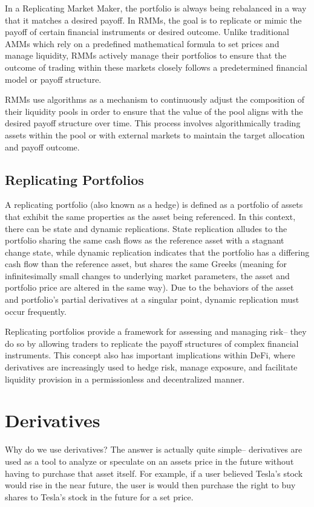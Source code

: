 \documentclass[12pt]{article}
\begin{document}
In a Replicating Market Maker, the portfolio is always being rebalanced in a way that it matches a desired payoff. In RMMs, the goal is to replicate or mimic the payoff of certain financial instruments or desired outcome. Unlike traditional AMMs which rely on a predefined mathematical formula to set prices and manage liquidity, RMMs actively manage their portfolios to ensure that the outcome of trading within these markets closely follows a predetermined financial model or payoff structure.

RMMs use algorithms as a mechanism to continuously adjust the composition of their liquidity pools in order to ensure that the value of the pool aligns with the desired payoff structure over time. This process involves algorithmically trading assets within the pool or with external markets to maintain the target allocation and payoff outcome.

\subsection{Replicating Portfolios}

A replicating portfolio (also known as a hedge) is defined as a portfolio of assets that exhibit the same properties as the asset being referenced. In this context, there can be state and dynamic replications. State replication alludes to the portfolio sharing the same cash flows as the reference asset with a stagnant change state, while dynamic replication indicates that the portfolio has a differing cash flow than the reference asset,  but shares the same Greeks (meaning for infinitesimally small changes to underlying market parameters, the asset and portfolio price are altered in the same way). Due to the behaviors of the asset and portfolio’s partial derivatives at a singular point, dynamic replication must occur frequently. 

Replicating portfolios provide a framework for assessing and managing risk-- they do so by allowing traders to replicate the payoff structures of complex financial instruments. This concept also has important implications within DeFi, where derivatives are increasingly used to hedge risk, manage exposure, and facilitate liquidity provision in a permissionless and decentralized manner. 
\section{Derivatives}
Why do we use derivatives? The answer is actually quite simple-- derivatives are used as a tool to analyze or speculate on an assets price in the future without having to purchase that asset itself. For example, if a user believed Tesla's stock would rise in the near future, the user is would then purchase the right to buy shares to Tesla's stock in the future for a set price.
\end{document}
